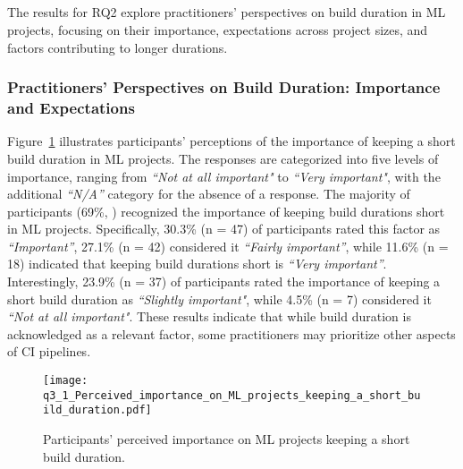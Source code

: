 
\subsection*{\textbf{\RQtwo}}


The results for RQ2 explore practitioners' perspectives on build duration in ML projects, focusing on their importance, expectations across project sizes, and factors contributing to longer durations.

\subsubsection*{\textbf{Practitioners' Perspectives on Build Duration: Importance and Expectations}}

Figure~\ref{fig:q3_1_Perceived_importance_on_ML_projects_keeping_a_short_build_duration} illustrates participants' perceptions of the importance of keeping a short build duration in ML projects. The responses are categorized into five levels of importance, ranging from \textit{``Not at all important"} to \textit{``Very important"}, with the additional \textit{``N/A''} category for the absence of a response. 
The majority of participants (69\%, ) recognized the importance of keeping build durations short in ML projects. Specifically, 30.3\% (n = 47) of participants rated this factor as \textit{``Important''}, 27.1\% (n = 42) considered it \textit{``Fairly important''}, while 11.6\% (n = 18) indicated that keeping build durations short is \textit{``Very important''}.
Interestingly, 23.9\% (n = 37) of participants rated the importance of keeping a short build duration as \textit{``Slightly important"}, while 4.5\% (n = 7) considered it \textit{``Not at all important"}. These results indicate that while build duration is acknowledged as a relevant factor, some practitioners may prioritize other aspects of CI pipelines.


\begin{figure}
	\centering
	\texttt{[image: q3\_1\_Perceived\_importance\_on\_ML\_projects\_keeping\_a\_short\_build\_duration.pdf]}	
	\caption{Participants' perceived importance on ML projects keeping a short build duration.}	\label{fig:q3_1_Perceived_importance_on_ML_projects_keeping_a_short_build_duration}       %
\end{figure}

